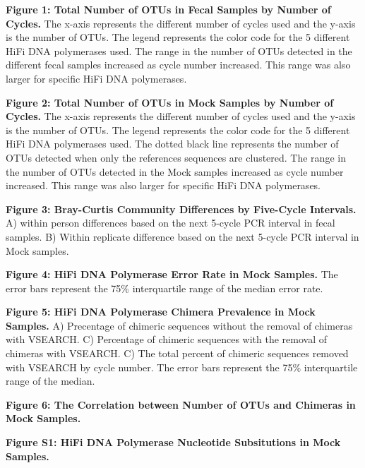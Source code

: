 \documentclass[12pt,]{article}
\begin{document}
\newpage

\textbf{Figure 1: Total Number of OTUs in Fecal Samples by Number of
Cycles.} The x-axis represents the different number of cycles used and
the y-axis is the number of OTUs. The legend represents the color code
for the 5 different HiFi DNA polymerases used. The range in the number
of OTUs detected in the different fecal samples increased as cycle
number increased. This range was also larger for specific HiFi DNA
polymerases.

\textbf{Figure 2: Total Number of OTUs in Mock Samples by Number of
Cycles.} The x-axis represents the different number of cycles used and
the y-axis is the number of OTUs. The legend represents the color code
for the 5 different HiFi DNA polymerases used. The dotted black line
represents the number of OTUs detected when only the references
sequences are clustered. The range in the number of OTUs detected in the
Mock samples increased as cycle number increased. This range was also
larger for specific HiFi DNA polymerases.

\textbf{Figure 3: Bray-Curtis Community Differences by Five-Cycle
Intervals.} A) within person differences based on the next 5-cycle PCR
interval in fecal samples. B) Within replicate difference based on the
next 5-cycle PCR interval in Mock samples.

\textbf{Figure 4: HiFi DNA Polymerase Error Rate in Mock Samples.} The
error bars represent the 75\% interquartile range of the median error
rate.

\textbf{Figure 5: HiFi DNA Polymerase Chimera Prevalence in Mock
Samples.} A) Precentage of chimeric sequences without the removal of
chimeras with VSEARCH. C) Percentage of chimeric sequences with the
removal of chimeras with VSEARCH. C) The total percent of chimeric
sequences removed with VSEARCH by cycle number. The error bars represent
the 75\% interquartile range of the median.

\textbf{Figure 6: The Correlation between Number of OTUs and Chimeras in
Mock Samples.}

\newpage

\textbf{Figure S1: HiFi DNA Polymerase Nucleotide Subsitutions in Mock
Samples.}
\end{document}
